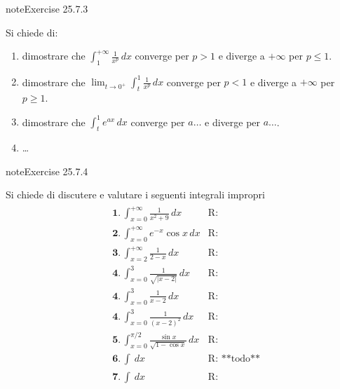 \documentclass[letterpaper,10pt,italian]{jupyterBook}
\begin{document}
\begin{sphinxadmonition}{note}{Exercise 25.7.3}





\sphinxAtStartPar
Si chiede di:
\begin{enumerate}
%
\item {} 
\sphinxAtStartPar
dimostrare che \(\int_{1}^{+\infty} \frac{1}{x^p} \, dx\) converge per \(p > 1\) e diverge a \(+\infty\) per \(p \le 1\).

\item {} 
\sphinxAtStartPar
dimostrare che \(\lim_{t \rightarrow 0^+} \int_{t}^{1} \frac{1}{x^p} \, dx\) converge per \(p < 1\) e diverge a \(+\infty\) per \(p \ge 1\).

\item {} 
\sphinxAtStartPar
dimostrare che \(\int_{t}^{1} e^{a x} \, dx\) converge per \(a \dots\) e diverge per \(a \dots\).

\item {} 
\sphinxAtStartPar
…

\end{enumerate}
\end{sphinxadmonition}
 \label{exercise:ch/infinitesimal_calculus/integrals-problems-exercise-3}

\begin{sphinxadmonition}{note}{Exercise 25.7.4}



\sphinxAtStartPar
Si chiede di discutere e valutare i seguenti integrali impropri
\begin{equation*}
\begin{split}\begin{aligned}
 & \mathbf{1.} \,  \int_{x=0}^{+\infty} \frac{1}{x^2 + 9} \, dx & \text{R: } \\
 & \mathbf{2.} \,  \int_{x=0}^{+\infty} e^{-x} \cos x \, dx & \text{R: } \\
 & \mathbf{3.} \,  \int_{x=2}^{+\infty} \frac{1}{2-x} \, dx & \text{R: } \\
 & \mathbf{4.} \,  \int_{x=0}^{3} \frac{1}{\sqrt{|x-2|}}\, dx & \text{R: } \\
 & \mathbf{4.} \,  \int_{x=0}^{3} \frac{1}{x-2}\, dx & \text{R: } \\
 & \mathbf{4.} \,  \int_{x=0}^{3} \frac{1}{(x-2)^2}\, dx & \text{R: } \\
 & \mathbf{5.} \,  \int_{x=0}^{\pi/2} \frac{\sin x}{\sqrt{1-\cos x}} \, dx & \text{R: } \\
 & \mathbf{6.} \,  \int_{}^{} \, dx & \text{R: **todo**} \\
 & \mathbf{7.} \,  \int_{}^{} \, dx & \text{R: } \\
\end{aligned}\end{split}
\end{equation*}\end{sphinxadmonition}
\end{document}

